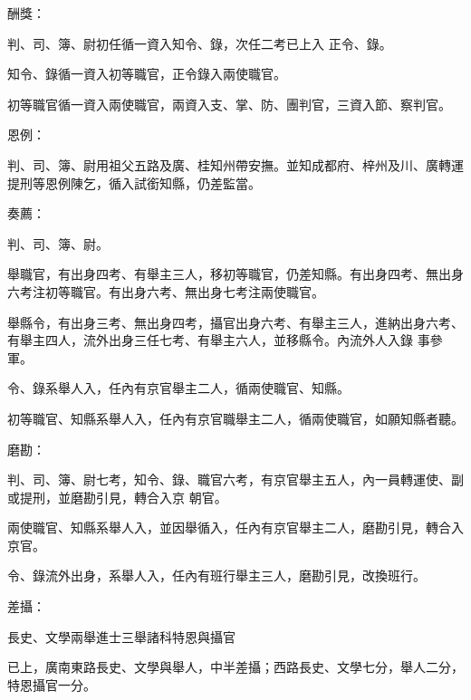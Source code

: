\begin{pinyinscope}
 酬獎：



 判、司、簿、尉初任循一資入知令、錄，次任二考已上入
 正令、錄。



 知令、錄循一資入初等職官，正令錄入兩使職官。



 初等職官循一資入兩使職官，兩資入支、掌、防、團判官，三資入節、察判官。



 恩例：



 判、司、簿、尉用祖父五路及廣、桂知州帶安撫。並知成都府、梓州及川、廣轉運提刑等恩例陳乞，循入試銜知縣，仍差監當。



 奏薦：



 判、司、簿、尉。



 舉職官，有出身四考、有舉主三人，移初等職官，仍差知縣。有出身四考、無出身六考注初等職官。有出身六考、無出身七考注兩使職官。



 舉縣令，有出身三考、無出身四考，攝官出身六考、有舉主三人，進納出身六考、有舉主四人，流外出身三任七考、有舉主六人，並移縣令。內流外人入錄
 事參軍。



 令、錄系舉人入，任內有京官舉主二人，循兩使職官、知縣。



 初等職官、知縣系舉人入，任內有京官職舉主二人，循兩使職官，如願知縣者聽。



 磨勘：



 判、司、簿、尉七考，知令、錄、職官六考，有京官舉主五人，內一員轉運使、副或提刑，並磨勘引見，轉合入京
 朝官。



 兩使職官、知縣系舉人入，並因舉循入，任內有京官舉主二人，磨勘引見，轉合入京官。



 令、錄流外出身，系舉人入，任內有班行舉主三人，磨勘引見，改換班行。



 差攝：



 長史、文學兩舉進士三舉諸科特恩與攝官



 已上，廣南東路長史、文學與舉人，中半差攝；西路長史、文學七分，舉人二分，特恩攝官一分。




\end{pinyinscope}
